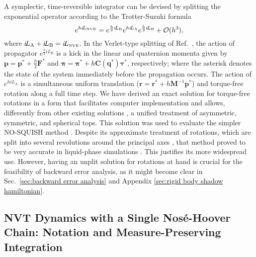 \documentclass[
	aip,
	jcp,
	reprint,
]{revtex4-1}
\newcommand{\mt}[1]{\boldsymbol{\mathbf{#1}}}          %
\newcommand{\vt}[1]{\boldsymbol{\mathbf{#1}}}          %
\newcommand{\Liu}[1]{i\!L_\text{#1}}                   %
\newcommand{\timestep}{h}
\begin{document}
A symplectic, time-reversible integrator can be devised by splitting the exponential operator according to the Trotter-Suzuki formula \cite{Trotter_1959, Suzuki_1976}
\begin{equation}
\label{eq:splitting NVE}
e^{\timestep \Liu{\tiny NVE}} = e^{\frac{\timestep}{2} \Liu{B}} e^{\timestep \Liu{A}} e^{\frac{\timestep}{2} \Liu{B}} + \mathcal{O}(\timestep^3),
\end{equation}
where $\Liu{A} + \Liu{B} = \Liu{\tiny NVE}$.
In the Verlet-type splitting of Ref.~, the action of propagator $e^{\frac{\timestep}{2} \Liu{B}}$ is a kick in the linear and quaternion momenta given by ${\vt p} = {\vt p}^\ast + \frac{\timestep}{2} {\vt F}^\ast$ and ${\vt \pi} = {\vt \pi}^\ast + \timestep {\mt C}({\vt q^\ast}) {\vt \tau}^\ast$, respectively; where the asterisk denotes the state of the system immediately before the propagation occurs.
The action of $e^{\timestep \Liu{A}}$ is a simultaneous uniform translation (${\vt r} = {\vt r}^\ast + \timestep {\mt M}^{-1} {\vt p}^\ast$) and torque-free rotation along a full time step.
We have derived \cite{Silveira_2017} an exact solution for torque-free rotations in a form that facilitates computer implementation and allows, differently from other existing solutions \cite{Kosenko_1998, vanZon2007, Celledoni_2008}, a unified treatment of asymmetric, symmetric, and spherical tops.
This solution was used to evaluate the simpler NO-SQUISH method \cite{Miller_2002}.
Despite its approximate treatment of rotations, which are split into several revolutions around the principal axes \cite{Dullweber_1997}, that method proved to be very accurate in liquid-phase simulations \cite{Silveira_2017}.
This justifies its more widespread use.
However, having an unplit solution for rotations at hand is crucial for the feasibility of backward error analysis, as it might become clear in Sec.~\ref{sec:backward error analysis} and Appendix \ref{sec:rigid body shadow hamiltonian}.

\subsection{NVT Dynamics with a Single Nos\'{e}-Hoover Chain: Notation and Measure-Preserving Integration}
\label{sec:nvt}
\end{document}
